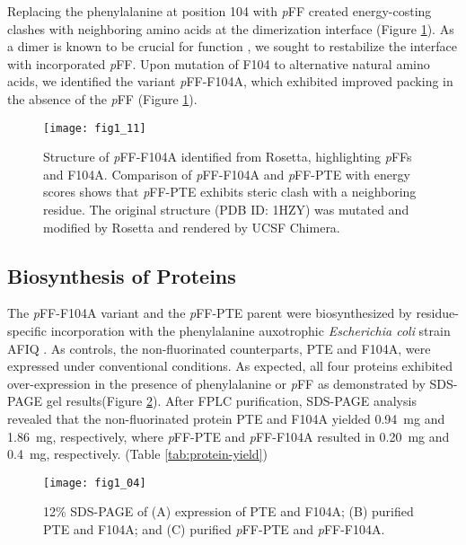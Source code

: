 \begin{refsection}
Replacing the phenylalanine at position 104 with \emph{p}FF created
energy-costing clashes with neighboring amino acids at the dimerization
interface (Figure \ref{fig:rosetta-pte}). As a dimer is known to be crucial for
function \cite{Baker2011b}, we sought to restabilize the interface with
incorporated \emph{p}FF. Upon mutation of F104 to alternative natural amino
acids, we identified the variant \emph{p}FF-F104A, which exhibited improved
packing in the absence of the \emph{p}FF (Figure \ref{fig:rosetta-pte}).
\begin{figure}[htbp] \centering \texttt{[image: fig1\_11]}
    \caption[Structure of \emph{p}FF-F104A identified from Rosetta,
        highlighting \emph{p}FFs and F104A. Comparison of \emph{p}FF-F104A and
        \emph{p}FF-PTE with energy scores shows that \emph{p}FF-PTE exhibits
        steric clash with a neighboring residue.  The original structure (PDB
        ID: 1HZY) was mutated and modified by Rosetta and rendered by UCSF
    Chimera.]{Structure of \emph{p}FF-F104A identified from Rosetta,
    highlighting \emph{p}FFs and F104A. Comparison of \emph{p}FF-F104A and
    \emph{p}FF-PTE with energy scores shows that \emph{p}FF-PTE exhibits steric
    clash with a neighboring residue. The original structure (PDB ID: 1HZY) was
    mutated and modified by Rosetta and rendered by UCSF Chimera.}
    \label{fig:rosetta-pte}
\end{figure}

\subsection{Biosynthesis of Proteins}

The \emph{p}FF-F104A variant and the \emph{p}FF-PTE parent were biosynthesized
by residue-specific incorporation with the phenylalanine auxotrophic
\emph{Escherichia coli} strain AFIQ \cite{Yang2014a}. As controls, the
non-fluorinated counterparts, PTE and F104A, were expressed under conventional
conditions. As expected, all four proteins exhibited over-expression in the
presence of phenylalanine or \emph{p}FF as demonstrated by SDS-PAGE gel results(Figure
\ref{fig:sds-gel}). After FPLC purification, SDS-PAGE analysis revealed that
the non-fluorinated protein PTE and F104A yielded \SI{0.94}{\mg} and
\SI{1.86}{\mg}, respectively, where \emph{p}FF-PTE and \emph{p}FF-F104A resulted in
\SI{0.20}{\mg} and \SI{0.4}{\mg}, respectively. (Table \ref{tab:protein-yield})
\begin{figure}[htbp] \centering \texttt{[image: fig1\_04]}
    \caption[12\% SDS-PAGE of (A) expression of PTE and
    F104A; (B) purified PTE and F104A; and (C) purified \emph{p}FF-PTE and
\emph{p}FF-F104A.]{12\% SDS-PAGE of (A) expression of PTE
    and F104A; (B) purified PTE and F104A; and (C) purified \emph{p}FF-PTE and
    \emph{p}FF-F104A.} 
    \label{fig:sds-gel}
\end{figure}


\end{refsection}
